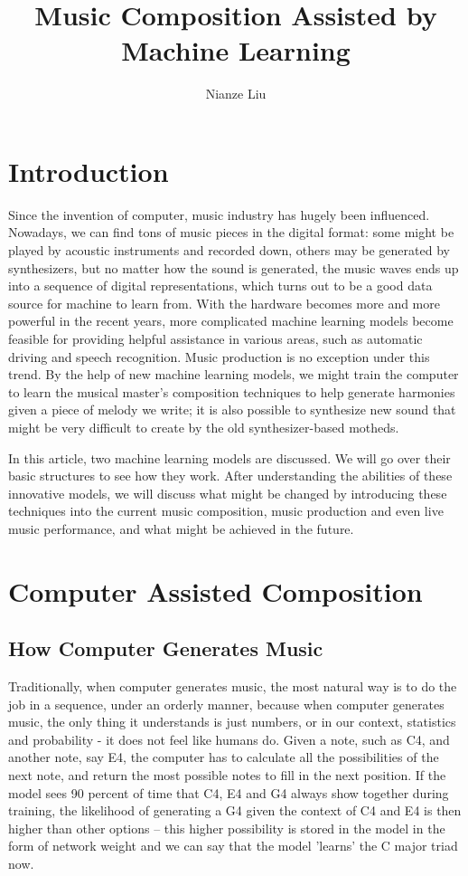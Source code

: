 \documentclass[jou]{apa6}
\title{Music Composition Assisted by Machine Learning}
\author{Nianze Liu}
\affiliation{New York University}
\begin{document}
\maketitle

\section{Introduction}

Since the invention of computer, music industry has hugely been influenced. Nowadays, we can find tons of music pieces in the digital format: some might be played by acoustic instruments and recorded down, others may be generated by synthesizers, but no matter how the sound is generated, the music waves ends up into a sequence of digital representations, which turns out to be a good data source for machine to learn from. With the hardware becomes more and more powerful in the recent years, more complicated machine learning models become feasible for providing helpful assistance in various areas, such as automatic driving and speech recognition. Music production is no exception under this trend. By the help of new machine learning models, we might train the computer to learn the musical master's composition techniques to help generate harmonies given a piece of melody we write; it is also possible to synthesize new sound that might be very difficult to create by the old synthesizer-based motheds.

In this article, two machine learning models are discussed. We will go over their basic structures to see how they work. After understanding the abilities of these innovative models, we will discuss what might be changed by introducing these techniques into the current music composition, music production and even live music performance, and what might be achieved in the future.

\section{Computer Assisted Composition}

\subsection{How Computer Generates Music}

Traditionally, when computer generates music, the most natural way is to do the job in a sequence, under an orderly manner, because when computer generates music, the only thing it understands is just numbers, or in our context, statistics and probability - it does not feel like humans do. Given a note, such as C4, and another note, say E4, the computer has to calculate all the possibilities of the next note, and return the most possible notes to fill in the next position. If the model sees 90 percent of time that C4, E4 and G4 always show together during training, the likelihood of generating a G4 given the context of C4 and E4 is then higher than other options -- this higher possibility is stored in the model in the form of network weight and we can say that the model 'learns' the C major triad now. 
\end{document}
